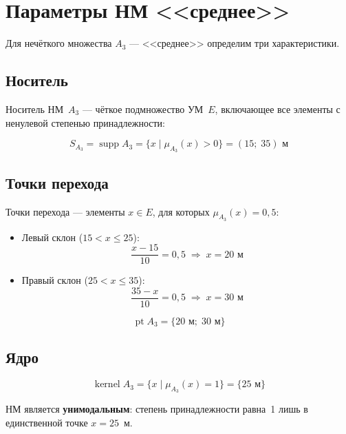 \documentclass[14pt,a4paper]{extarticle}
\begin{document}
\section{Параметры НМ <<среднее>>}

Для нечёткого множества $A_3$ --- <<среднее>> определим три характеристики.

\subsection{Носитель}

Носитель НМ~$A_3$ --- чёткое подмножество УМ~$E$,
включающее все элементы с ненулевой степенью принадлежности:

\begin{equation}
    S_{A_3} = \operatorname{supp} A_3
            = \{x \mid \mu_{A_3}(x) > 0\}
            = (15;\;35) \text{ м}
\end{equation}

\subsection{Точки перехода}

Точки перехода --- элементы $x \in E$,
для которых $\mu_{A_3}(x) = 0{,}5$:

\begin{itemize}
    \item Левый склон ($15 < x \leq 25$):
    \[
        \frac{x - 15}{10} = 0{,}5 \;\Rightarrow\; x = 20 \text{ м}
    \]
    \item Правый склон ($25 < x \leq 35$):
    \[
        \frac{35 - x}{10} = 0{,}5 \;\Rightarrow\; x = 30 \text{ м}
    \]
\end{itemize}

\begin{equation}
    \boxed{\operatorname{pt} A_3 = \{20 \text{ м};\;30 \text{ м}\}}
\end{equation}

\subsection{Ядро}

\begin{equation}
    \operatorname{kernel} A_3
    = \{x \mid \mu_{A_3}(x) = 1\}
    = \{25 \text{ м}\}
\end{equation}

НМ является \textbf{унимодальным}: степень принадлежности равна~1
лишь в единственной точке $x = 25$~м.
\end{document}
